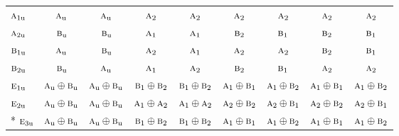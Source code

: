 \documentclass[10pt,a4paper]{article}
\numberwithin{equation}{section}
\newcommand{\irr}[1]{\text{\normalfont\scshape #1}}
\newcommand{\ptag}[1]{\mathrm{#1}}
\begin{document}
{\begin{longtable}{@{}lcccccccc@{}}
$\irr{a}_{1\ptag{u}}$ & $\irr{a}_{\ptag{u}}$ & $\irr{a}_{\ptag{u}}$ & $\irr{a}_{2}$ & $\irr{a}_{2}$ & $\irr{a}_{2}$ & $\irr{a}_{2}$ & $\irr{a}_{2}$ & $\irr{a}_{2}$\\
$\irr{a}_{2\ptag{u}}$ & $\irr{b}_{\ptag{u}}$ & $\irr{b}_{\ptag{u}}$ & $\irr{a}_{1}$ & $\irr{a}_{1}$ & $\irr{b}_{2}$ & $\irr{b}_{1}$ & $\irr{b}_{2}$ & $\irr{b}_{1}$\\
$\irr{b}_{1\ptag{u}}$ & $\irr{a}_{\ptag{u}}$ & $\irr{b}_{\ptag{u}}$ & $\irr{a}_{2}$ & $\irr{a}_{1}$ & $\irr{a}_{2}$ & $\irr{a}_{2}$ & $\irr{b}_{2}$ & $\irr{b}_{1}$\\
$\irr{b}_{2\ptag{u}}$ & $\irr{b}_{\ptag{u}}$ & $\irr{a}_{\ptag{u}}$ & $\irr{a}_{1}$ & $\irr{a}_{2}$ & $\irr{b}_{2}$ & $\irr{b}_{1}$ & $\irr{a}_{2}$ & $\irr{a}_{2}$\\
$\irr{e}_{1\ptag{u}}$ & $\irr{a}_{\ptag{u}}\oplus \irr{b}_{\ptag{u}}$ & $\irr{a}_{\ptag{u}}\oplus \irr{b}_{\ptag{u}}$ & $\irr{b}_{1}\oplus \irr{b}_{2}$ & $\irr{b}_{1}\oplus \irr{b}_{2}$ & $\irr{a}_{1}\oplus \irr{b}_{1}$ & $\irr{a}_{1}\oplus \irr{b}_{2}$ & $\irr{a}_{1}\oplus \irr{b}_{1}$ & $\irr{a}_{1}\oplus \irr{b}_{2}$\\
$\irr{e}_{2\ptag{u}}$ & $\irr{a}_{\ptag{u}}\oplus \irr{b}_{\ptag{u}}$ & $\irr{a}_{\ptag{u}}\oplus \irr{b}_{\ptag{u}}$ & $\irr{a}_{1}\oplus \irr{a}_{2}$ & $\irr{a}_{1}\oplus \irr{a}_{2}$ & $\irr{a}_{2}\oplus \irr{b}_{2}$ & $\irr{a}_{2}\oplus \irr{b}_{1}$ & $\irr{a}_{2}\oplus \irr{b}_{2}$ & $\irr{a}_{2}\oplus \irr{b}_{1}$\\*
$\irr{e}_{3\ptag{u}}$ & $\irr{a}_{\ptag{u}}\oplus \irr{b}_{\ptag{u}}$ & $\irr{a}_{\ptag{u}}\oplus \irr{b}_{\ptag{u}}$ & $\irr{b}_{1}\oplus \irr{b}_{2}$ & $\irr{b}_{1}\oplus \irr{b}_{2}$ & $\irr{a}_{1}\oplus \irr{b}_{1}$ & $\irr{a}_{1}\oplus \irr{b}_{2}$ & $\irr{a}_{1}\oplus \irr{b}_{1}$ & $\irr{a}_{1}\oplus \irr{b}_{2}$\\
\bottomrule\end{longtable}}
\end{document}
